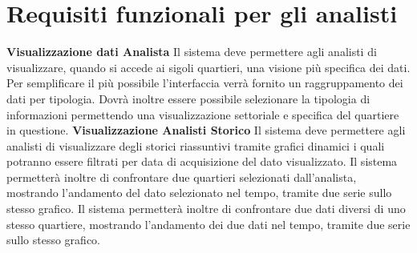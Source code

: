     \section{Requisiti funzionali per gli analisti}
        \begin{rfList}
            \rfItem \textbf{Visualizzazione dati Analista} Il sistema deve permettere agli analisti di visualizzare, quando si accede ai sigoli quartieri, una visione più specifica dei dati. Per semplificare il più possibile l'interfaccia verrà fornito un raggruppamento dei dati per tipologia. Dovrà inoltre essere possibile selezionare la tipologia di informazioni permettendo una visualizzazione settoriale e specifica del quartiere in questione.
            \rfItem \textbf{Visualizzazione Analisti Storico} Il sistema deve permettere agli analisti di visualizzare degli storici riassuntivi tramite grafici dinamici i quali potranno essere filtrati per data di acquisizione del dato visualizzato. Il sistema permetterà inoltre di confrontare due quartieri selezionati dall'analista, mostrando l'andamento del dato selezionato nel tempo, tramite due serie sullo stesso grafico. Il sistema permetterà inoltre di confrontare due dati diversi di uno stesso quartiere, mostrando l'andamento dei due dati nel tempo, tramite due serie sullo stesso grafico. 
        \end{rfList}

